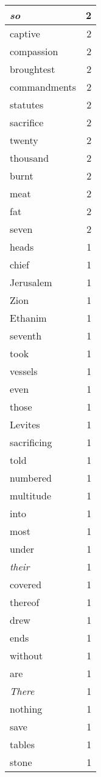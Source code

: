 \begin{center}
\begin{longtable}{l|r}
\emph{so} & 2 \\ \hline
captive & 2 \\ \hline
compassion & 2 \\ \hline
broughtest & 2 \\ \hline
commandments & 2 \\ \hline
statutes & 2 \\ \hline
sacrifice & 2 \\ \hline
twenty & 2 \\ \hline
thousand & 2 \\ \hline
burnt & 2 \\ \hline
meat & 2 \\ \hline
fat & 2 \\ \hline
seven & 2 \\ \hline
heads & 1 \\ \hline
chief & 1 \\ \hline
Jerusalem & 1 \\ \hline
Zion & 1 \\ \hline
Ethanim & 1 \\ \hline
seventh & 1 \\ \hline
took & 1 \\ \hline
vessels & 1 \\ \hline
even & 1 \\ \hline
those & 1 \\ \hline
Levites & 1 \\ \hline
sacrificing & 1 \\ \hline
told & 1 \\ \hline
numbered & 1 \\ \hline
multitude & 1 \\ \hline
into & 1 \\ \hline
most & 1 \\ \hline
under & 1 \\ \hline
\emph{their} & 1 \\ \hline
covered & 1 \\ \hline
thereof & 1 \\ \hline
drew & 1 \\ \hline
ends & 1 \\ \hline
without & 1 \\ \hline
are & 1 \\ \hline
\emph{There} & 1 \\ \hline
nothing & 1 \\ \hline
save & 1 \\ \hline
tables & 1 \\ \hline
stone & 1 \\ \hline

\end{longtable}
\end{center}
